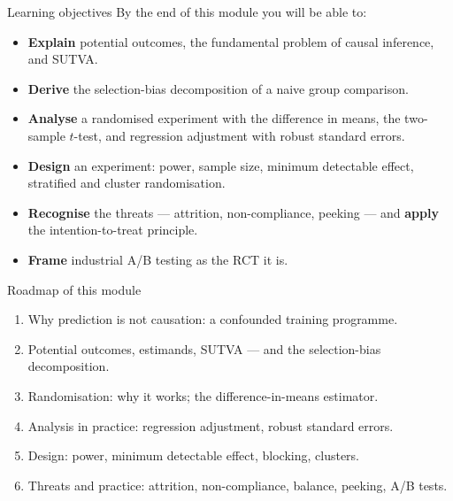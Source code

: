 \documentclass[aspectratio=169,11pt]{beamer}
\begin{document}
\begin{frame}{Learning objectives}
  By the end of this module you will be able to:
  \begin{itemize}
    \item \textbf{Explain} potential outcomes, the fundamental problem of causal
          inference, and SUTVA.
    \item \textbf{Derive} the selection-bias decomposition of a naive group comparison.
    \item \textbf{Analyse} a randomised experiment with the difference in means, the
          two-sample $t$-test, and regression adjustment with robust standard errors.
    \item \textbf{Design} an experiment: power, sample size, minimum detectable effect,
          stratified and cluster randomisation.
    \item \textbf{Recognise} the threats --- attrition, non-compliance, peeking --- and
          \textbf{apply} the intention-to-treat principle.
    \item \textbf{Frame} industrial A/B testing as the RCT it is.
  \end{itemize}
\end{frame}

\begin{frame}{Roadmap of this module}
  \begin{takeaway}
    \begin{enumerate}
      \item Why prediction is not causation: a confounded training programme.
      \item Potential outcomes, estimands, SUTVA --- and the selection-bias decomposition.
      \item Randomisation: why it works; the difference-in-means estimator.
      \item Analysis in practice: regression adjustment, robust standard errors.
      \item Design: power, minimum detectable effect, blocking, clusters.
      \item Threats and practice: attrition, non-compliance, balance, peeking, A/B tests.
    \end{enumerate}
  \end{takeaway}
\end{frame}
\end{document}

